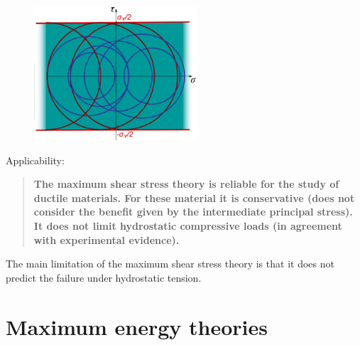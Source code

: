 \documentclass[class=report, crop=false, 12pt,a4paper]{standalone}
\begin{document}
\begin{figure}[H]
  \centering
  \includegraphics[height = 5cm]{../img/diagram27.png}
  \caption{}
\end{figure}
Applicability:
\begin{quotation}
  \textbf{The maximum shear stress theory is reliable for the study of ductile materials. For these material it is conservative (does not consider the benefit given by the intermediate principal stress). It does not limit hydrostatic compressive loads (in agreement with experimental evidence).}
\end{quotation}
The main limitation of the maximum shear stress theory is that it does not predict the failure under hydrostatic tension.
\section{Maximum energy theories}
\end{document}
